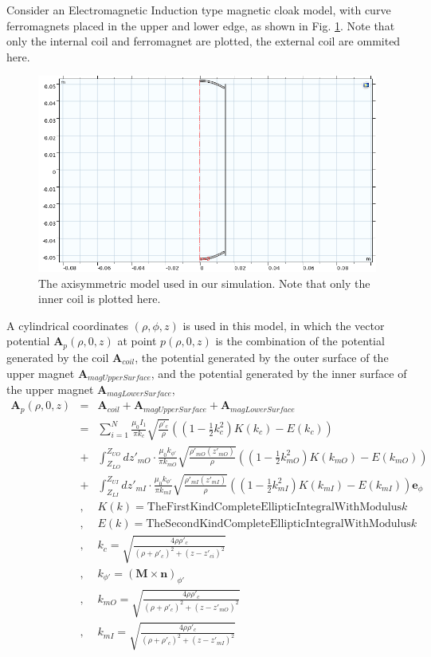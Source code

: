 Consider an Electromagnetic Induction type magnetic cloak model, with curve ferromagnets placed in the upper and lower edge,
as shown in Fig. \ref{fig:EIMC_modelWithFM}.
Note that only the internal coil and ferromagnet are plotted,
the external coil are ommited here.
\begin{figure}[H]
  \includegraphics[width=17cm, bb=9 9 900 550]{./section3Effectiveness/plannedFM2Structure.png}
  \caption{The axisymmetric model used in our simulation. Note that only the inner coil is plotted here.}
  \label{fig:EIMC_modelWithFM}
\end{figure}
A cylindrical coordinates $(\rho, \phi, z)$ is used in this model,
in which the vector potential $\mathbf{A}_p(\rho, 0, z)$ at point $p(\rho, 0, z)$ is the combination of
the potential generated by the coil $\mathbf{A}_{coil}$,
the potential generated by the outer surface of the upper magnet $\mathbf{A}_{magUpperSurface}$,
and the potential generated by the inner surface of the upper magnet $\mathbf{A}_{magLowerSurface}$,
\begin{eqnarray}
  \mathbf{A}_p(\rho, 0, z) &=& \mathbf{A}_{coil} + \mathbf{A}_{magUpperSurface} + \mathbf{A}_{magLowerSurface}\\\nonumber
  &=& \sum_{i=1}^{N}\frac{\mu_0I_1}{\pi k_c}\sqrt{\frac{\rho'_c}{\rho}}\left((1-\frac{1}{2}k_c^2)K(k_c) - E(k_c)\right)\\\nonumber
  &+& \int_{Z_{LO}}^{Z_{UO}}dz'_{mO}\cdot\frac{\mu_0k_{\phi'}}{\pi k_{mO}}\sqrt{\frac{\rho'_{mO}(z'_{mO})}{\rho}}\left((1-\frac{1}{2}k_{mO}^2)K(k_{mO}) - E(k_{mO})\right)\\\nonumber
  &+& \int_{Z_{LI}}^{Z_{UI}}dz'_{mI}\cdot\frac{\mu_0k_{\phi'}}{\pi k_{mI}}\sqrt{\frac{\rho'_{mI}(z'_{mI})}{\rho}}\left((1-\frac{1}{2}k_{mI}^2)K(k_{mI}) - E(k_{mI})\right)\mathbf{e}_{\phi}\\\nonumber
  &,& K(k) = \mathrm{TheFirstKindCompleteEllipticIntegralWithModulus} k\\\nonumber
  &,& E(k) = \mathrm{TheSecondKindCompleteEllipticIntegralWithModulus} k\\\nonumber
  &,& k_c = \sqrt{\frac{4\rho\rho'_c}{(\rho+\rho'_c)^2+(z-z'_{ci})^2}}\\\nonumber
  &,& k_{\phi'} = (\mathbf{M}\times\mathbf{n})_{\phi'}\\\nonumber
  &,& k_{mO} = \sqrt{\frac{4\rho\rho'_c}{(\rho+\rho'_c)^2+(z-z'_{mO})^2}}\\\nonumber
  &,& k_{mI} = \sqrt{\frac{4\rho\rho'_c}{(\rho+\rho'_c)^2+(z-z'_{mI})^2}}\nonumber
\end{eqnarray}

